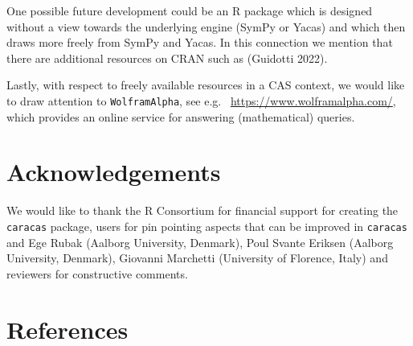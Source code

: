 One possible future development could be an R package which is
designed without a view towards the underlying engine (SymPy or Yacas)
and which then draws more freely from SymPy and Yacas.
In this connection we mention that there are additional resources
on CRAN such as  (Guidotti 2022).

Lastly, with respect to freely available resources in a CAS context, we would
like to draw attention to \texttt{WolframAlpha}, see e.g.~
\url{https://www.wolframalpha.com/}, which provides an online service for
answering (mathematical) queries.

\hypertarget{acknowledgements}{%
\section{Acknowledgements}\label{acknowledgements}}

We would like to thank the R Consortium for financial support for
creating the \texttt{caracas} package, users for pin pointing aspects
that can be improved in \texttt{caracas}
and Ege Rubak (Aalborg University, Denmark),
Poul Svante Eriksen (Aalborg University, Denmark),
Giovanni Marchetti (University of Florence, Italy)
and reviewers for constructive comments.

\hypertarget{references}{%
\section*{References}\label{references}}

